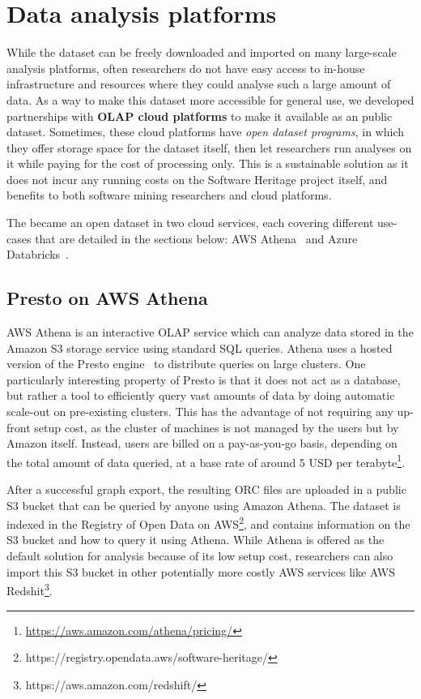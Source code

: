 \section{Data analysis platforms}

While the dataset can be freely downloaded and imported on many large-scale
analysis platforms, often researchers do not have easy access to in-house
infrastructure and resources where they could analyse such a large amount of
data.
As a way to make this dataset more accessible for general use, we developed
partnerships with \textbf{\gls{OLAP} cloud platforms} to make it available as
an public dataset. Sometimes, these cloud platforms have \emph{open dataset
programs}, in which they offer storage space for the dataset itself, then
let researchers run analyses on it while paying for the cost of processing
only. This is a sustainable solution as it does not incur any running costs on
the Software Heritage project itself, and benefits to both software mining
researchers and cloud platforms.

The \SWHGD{} became an open dataset in two cloud services, each covering
different use-cases that are detailed in the sections below: AWS
Athena~\cite{website-amazon-athena} and Azure
Databricks~\cite{website-azure-databricks}.

\subsection{Presto on AWS Athena}

AWS Athena is an interactive OLAP service which can analyze data stored in
the Amazon S3 storage service using standard SQL queries. Athena uses a hosted
version of the Presto engine~\cite{sethi2019presto} to distribute queries on
large clusters.  One particularly interesting property of Presto is that it
does not act as a database, but rather a tool to efficiently query vast amounts
of data by doing automatic scale-out on pre-existing clusters. This has the
advantage of not requiring any up-front setup cost, as the cluster of machines
is not managed by the users but by Amazon itself. Instead, users are billed on
a pay-as-you-go basis, depending on the total amount of data queried, at a base
rate of around 5 USD per
terabyte\footnote{\url{https://aws.amazon.com/athena/pricing/}}.

After a successful graph export, the resulting ORC files are uploaded in a public
S3 bucket that can be queried by anyone using Amazon Athena. The dataset is
indexed in the Registry of Open Data on
AWS\footnote{https://registry.opendata.aws/software-heritage/}, and contains
information on the S3 bucket and how to query it using Athena. While Athena is
offered as the default solution for analysis because of its low setup cost,
researchers can also import this S3 bucket in other potentially more costly AWS
services like AWS Redshit\footnote{https://aws.amazon.com/redshift/}.

